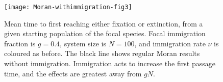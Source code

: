 \begin{figure}[ht]
	\centering
	\texttt{[image: Moran-withimmigration-fig3]}
	\caption{Mean time to first reaching either fixation or extinction, from a given starting population of the focal species. Focal immigration fraction is $g=0.4$, system size is $N=100$, and immigration rate $\nu$ is coloured as before. The black line shows regular Moran results without immigration. Immigration acts to increase the first passage time, and the effects are greatest away from $gN$. } \label{extntimefig}
\end{figure}%

